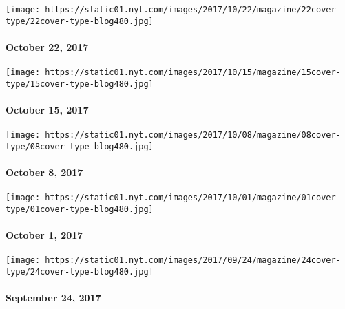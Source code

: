 \href{https://www.nytimes.com/issue/magazine/2017/10/20/102217-issue}{}

\texttt{[image: https://static01.nyt.com/images/2017/10/22/magazine/22cover-type/22cover-type-blog480.jpg]}

\hypertarget{october-22-2017}{%
\paragraph{October 22, 2017}\label{october-22-2017}}

\href{https://www.nytimes.com/issue/magazine/2017/10/13/101517-issue}{}

\texttt{[image: https://static01.nyt.com/images/2017/10/15/magazine/15cover-type/15cover-type-blog480.jpg]}

\hypertarget{october-15-2017}{%
\paragraph{October 15, 2017}\label{october-15-2017}}

\href{https://www.nytimes.com/issue/magazine/2017/10/06/100817-issue}{}

\texttt{[image: https://static01.nyt.com/images/2017/10/08/magazine/08cover-type/08cover-type-blog480.jpg]}

\hypertarget{october-8-2017}{%
\paragraph{October 8, 2017}\label{october-8-2017}}

\href{https://www.nytimes.com/issue/magazine/2017/09/29/100117-issue}{}

\texttt{[image: https://static01.nyt.com/images/2017/10/01/magazine/01cover-type/01cover-type-blog480.jpg]}

\hypertarget{october-1-2017}{%
\paragraph{October 1, 2017}\label{october-1-2017}}

\href{https://www.nytimes.com/interactive/2017/09/21/magazine/voyages-issue-photographs-family-vacations-around-world.html}{}

\texttt{[image: https://static01.nyt.com/images/2017/09/24/magazine/24cover-type/24cover-type-blog480.jpg]}

\hypertarget{september-24-2017}{%
\paragraph{September 24, 2017}\label{september-24-2017}}

